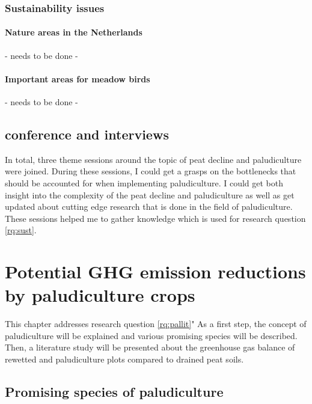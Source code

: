 \documentclass[a4paper,12pt]{scrbook}
\begin{document}
\subsection{Sustainability issues}

\subsubsection{Nature areas in the Netherlands}
- needs to be done -

\subsubsection{Important areas for meadow birds}
- needs to be done -

\section{conference and interviews}
In total, three theme sessions around the topic of peat decline and paludiculture were joined. During these sessions, I could get a grasps on the bottlenecks that should be accounted for when implementing paludiculture. I could get both insight into the complexity of the peat decline and paludiculture as well as get updated about cutting edge research that is done in the field of paludiculture. These sessions helped me to gather knowledge which is used for research question \ref{rq:sust}.


\chapter{Potential GHG emission reductions by paludiculture crops} \label{ch:litpalghg}

This chapter addresses research question \ref{rq:pallit}" As a first step, the concept of paludiculture will be explained and various promising species will be described. Then, a literature study will be presented about the greenhouse gas balance of rewetted and paludiculture plots compared to drained peat soils.

\section{Promising species of paludiculture}
\end{document}
